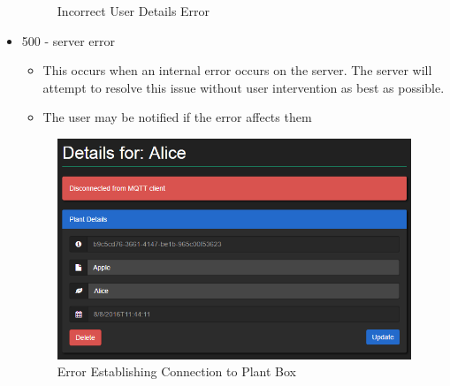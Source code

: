 \documentclass{article}
\begin{document}
\begin{itemize}
\begin{figure}[H]
				\caption{Incorrect User Details Error}
			\end{figure}
		\item 500 - server error
			\begin{itemize}
				\item This occurs when an internal error occurs on the server. The server will attempt to resolve this issue without user intervention as best as possible.
				\item The user may be notified if the error affects them
			\end{itemize}
			\begin{figure}[H]
				\includegraphics[width=\textwidth]{../images/UserManual/500error.png}
				\caption{Error Establishing Connection to Plant Box}
			\end{figure}
	\end{itemize}    
\end{document}
